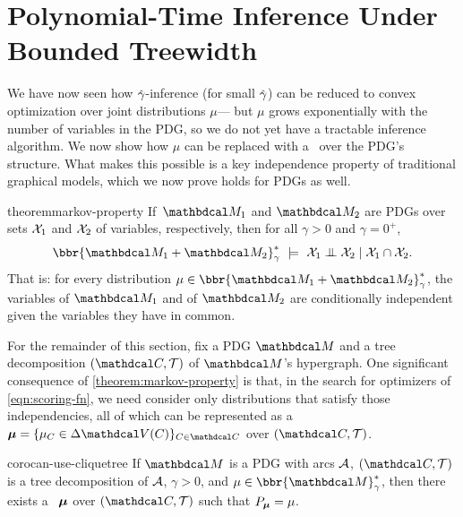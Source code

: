 \section{Polynomial-Time Inference Under Bounded Treewidth}
    \label{sec:clique-tree-expcone}
We have now seen how $\zogamma$-inference
(for small $\zogamma$) can be reduced to convex optimization
over joint distributions $\mu$---%
but $\mu$ grows exponentially with the number of variables in the PDG,
so we do not yet have a tractable inference algorithm.
We now show how $\mu$ can be replaced with a \actree\ over the PDG's structure. 
What makes this possible is a key independence property of traditional graphical models,
which we now prove
holds for PDGs as well.



\begin{linked}{theorem}{markov-property}
  If\, $\dg M_1$ and $\dg M_2$ are PDGs
    over sets $\mathcal X_1$ and $\mathcal X_2$ of variables, respectively,
    then for all $\gamma > 0$ and $\gamma=0^+$,
    \[  \bbr{\dg M_1 \bundle \dg M_2}^*_\gamma
			~\models~
		\X_1 \CI \X_2 \mid \X_1 \cap \X_2. 
    \] 
    That is: for every distribution $\mu \in \bbr{\dg M_1 \bundle \dg M_2}^*_\gamma$,
    the variables of $\dg M_1$ and of $\dg M_2$ are conditionally independent given the variables they have in common.
\end{linked}

For the remainder of this section, fix a PDG $\dg M$ and a tree decomposition $(\C, \mathcal T)$ of $\dg M$'s hypergraph.
One significant consequence of \cref{theorem:markov-property} is that, in the
search for optimizers of \eqref{eqn:scoring-fn}, we
need consider only distributions that satisfy those independencies,
all of which can be represented as a \actree\ 
$\bmu = \{\mu_C \in \Delta\V(C) \}_{C \in \C}$
over $(\C, \mathcal T)$.

\begin{linked}{coro}{can-use-cliquetree}
    If $\dg M$ is a PDG with arcs $\mathcal A$, 
    $(\C, \mathcal T)$ is a tree decomposition of $\mathcal A$,
    $\gamma > 0$, and
    $\mu \in \bbr{\dg M}^*_\gamma$, then there exists a \actree\ 
    $\boldsymbol\mu$ over $(\C, \mathcal T)$ such that $P_{\boldsymbol\mu} = \mu$.
\end{linked}

